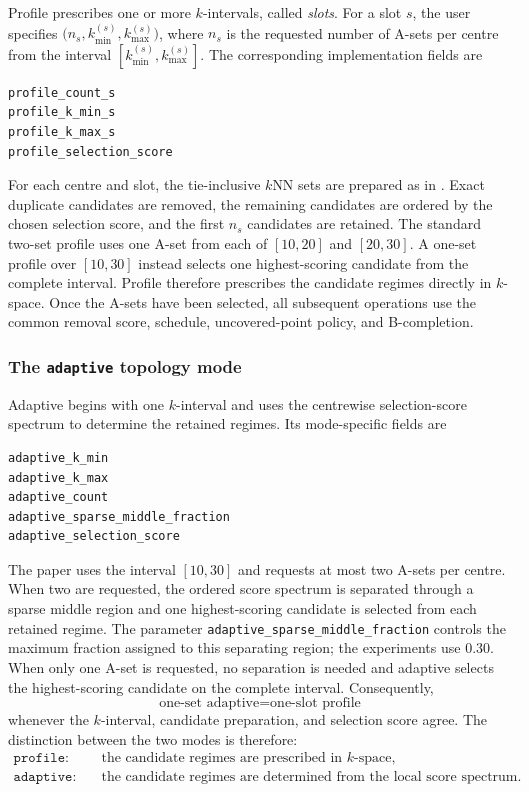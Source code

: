 \documentclass[a4paper,11pt]{article}
\theoremstyle{definition}
\theoremstyle{remark}
\begin{document}
Profile prescribes one or more $k$-intervals, called \emph{slots}. For a slot $s$, the user specifies $\bigl(n_s,k_{\min}^{(s)},k_{\max}^{(s)}\bigr)$, where $n_s$ is the requested number of A-sets per centre from the interval $[k_{\min}^{(s)},k_{\max}^{(s)}]$. The corresponding implementation fields are
\begin{Verbatim}[xleftmargin=2em]
profile_count_s
profile_k_min_s
profile_k_max_s
profile_selection_score
\end{Verbatim}

For each centre and slot, the tie-inclusive $k$NN sets are prepared as in . Exact duplicate candidates are removed, the remaining candidates are ordered by the chosen selection score, and the first $n_s$ candidates are retained. The standard two-set profile uses one A-set from each of $[10,20]$ and $[20,30]$. A one-set profile over $[10,30]$ instead selects one highest-scoring candidate from the complete interval. Profile therefore prescribes the candidate regimes directly in $k$-space. Once the A-sets have been selected, all subsequent operations use the common removal score, schedule, uncovered-point policy, and B-completion.

\subsubsection*{The \texttt{adaptive} topology mode}
\label{subsubsec:adaptive-mode}

Adaptive begins with one $k$-interval and uses the centrewise selection-score spectrum to determine the retained regimes. Its mode-specific fields are
\begin{Verbatim}[xleftmargin=2em]
adaptive_k_min
adaptive_k_max
adaptive_count
adaptive_sparse_middle_fraction
adaptive_selection_score
\end{Verbatim}

The paper uses the interval $[10,30]$ and requests at most two A-sets per centre. When two are requested, the ordered score spectrum is separated through a sparse middle region and one highest-scoring candidate is selected from each retained regime. The parameter \nolinkurl{adaptive\_sparse\_middle\_fraction} controls the maximum fraction assigned to this separating region; the experiments use
$0.30$. When only one A-set is requested, no separation is needed and adaptive selects the highest-scoring candidate on the complete interval. Consequently,
$$
\boxed{
\text{one-set adaptive} = \text{one-slot profile}
}
$$
whenever the $k$-interval, candidate preparation, and selection score agree. The distinction between the two modes is therefore:
$$
\boxed{
\begin{aligned}
\texttt{profile}:&
\quad\text{the candidate regimes are prescribed in $k$-space},\\
\texttt{adaptive}:&
\quad\text{the candidate regimes are determined from the local score spectrum}.
\end{aligned}}
$$
\end{document}
